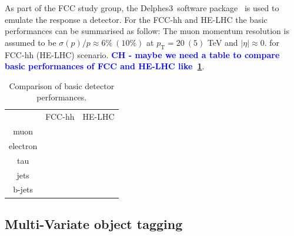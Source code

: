 \documentclass[a4paper,11pt]{article}
\newcommand{\CH}[1] {\textbf{\textcolor{blue}{CH - #1}}}
\newcommand{\pt}{\ensuremath{p_{\text{T}}}}
\newcommand{\delphes}{{\sc Delphes3}}
\begin{document}
As part of the FCC study group, the \delphes\ software package~\cite{deFavereau:2013fsa} is used to emulate the response a detector.
For the FCC-hh and HE-LHC the basic performances can be summarised as follow: The muon momentum resolution is assumed to be $\sigma(p)/p \approx 6\%~(10\%)$ at $\pt= 20~(5)$ TeV and $|\eta| \approx 0.$ for FCC-hh (HE-LHC) scenario.
\CH{maybe we need a table to compare basic performances of FCC and HE-LHC like~\ref{tab:delphes_comp}}.

\begin{table}[!htb]\centering
\begin{tabular}{|c|c|c|}
\hline
 & FCC-hh & HE-LHC \\
 muon & & \\
\hline
 electron  & & \\
\hline
 tau  & & \\
\hline
 jets & & \\
\hline
  b-jets  & & \\
\hline
\end{tabular}
\caption{Comparison of basic detector performances.}
\label{tab:delphes_comp}
\end{table}


\subsection{Multi-Variate object tagging}
\label{subsec:mvatagger}
\end{document}
